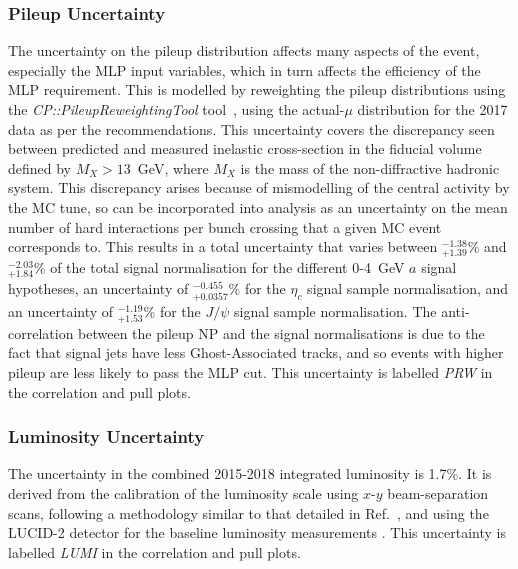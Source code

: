 \documentclass[NOTE, atlasdraft=true, texlive=2017, UKenglish]{\ATLASLATEXPATH atlasdoc}
\begin{document}
\subsubsection{Pileup Uncertainty}
\label{sec:sysprw}

The uncertainty on the pileup distribution affects many aspects of the event, especially the MLP input variables, which in turn affects the efficiency of the MLP requirement. This is modelled by reweighting the pileup distributions using the \emph{CP::PileupReweightingTool} tool~\cite{Buttinger:2014726}, using the actual-$\mu$ distribution for the 2017 data as per the recommendations. This uncertainty covers the discrepancy seen between predicted and measured inelastic cross-section in the fiducial volume defined by $M_X>13$~GeV, where $M_X$ is the mass of the non-diffractive hadronic system. This discrepancy arises because of mismodelling of the central activity by the MC tune, so can be incorporated into analysis as an uncertainty on the mean number of hard interactions per bunch crossing that a given MC event corresponds to. This results in a total uncertainty that varies between $^{-1.38}_{+1.39}\%$ and $^{-2.03}_{+1.84}\%$ of the total signal normalisation for the different 0-4~GeV $a$ signal hypotheses, an uncertainty of $^{-0.455}_{+0.0357}\%$ for the $\eta_c$ signal sample normalisation, and an uncertainty of $^{-1.19}_{+1.53}\%$ for the $J/\psi$ signal sample normalisation. The anti-correlation between the pileup NP and the signal normalisations is due to the fact that signal jets have less Ghost-Associated tracks, and so events with higher pileup are less likely to pass the MLP cut. This uncertainty is labelled \emph{PRW} in the correlation and pull plots.


\subsubsection{Luminosity Uncertainty}
\label{sec:syslumi}

The uncertainty in the combined 2015-2018 integrated luminosity is 1.7\%. It is derived from the calibration of the luminosity scale using $x$-$y$ beam-separation scans, following a methodology similar to that detailed in Ref.~\cite{DAPR-2013-01}, and using the LUCID-2 detector for the baseline luminosity measurements \cite{LUCID2}. This uncertainty is labelled \emph{LUMI} in the correlation and pull plots.

\end{document}
